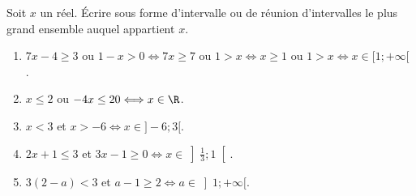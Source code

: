 
Soit $x$ un réel. Écrire sous forme d'intervalle ou de réunion d'intervalles le plus grand ensemble auquel appartient $x$.

\begin{enumerate}
	\item $7x -4 \geq 3$ ou $1-x>0 \Longleftrightarrow  7x  \geq 7$ ou $1 >x \Longleftrightarrow  x  \geq 1$ ou $1 > x \Longleftrightarrow x \in [1;+\infty[$   . 
	
	\item $x \leq 2$ ou $-4x \leq 20 \Longleftrightarrow x \in  \R$.
	\item $x < 3$ et $x > -6 \Longleftrightarrow x \in   ]-6;3[$.
	\item $2x+1 \leq 3$ et $3x-1 \geq 0 \Longleftrightarrow x \in \left] \frac{1}{3}; 1\right[ $.
	\item $3(2-a)<3$ et $a-1 \geq 2 \Longleftrightarrow a \in \left] 1; +\infty[  $.
\end{enumerate}
 
